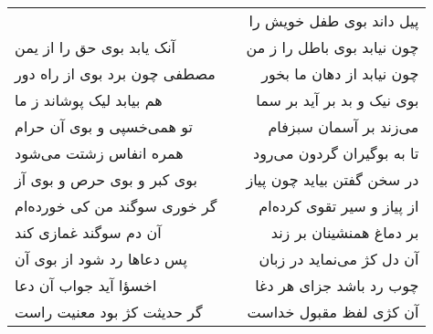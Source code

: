 \begin{center}
\begin{longtable}{l p{0.5cm} r}
&&
پیل داند بوی طفل خویش را
\\
آنک یابد بوی حق را از یمن
&&
چون نیابد بوی باطل را ز من
\\
مصطفی چون برد بوی از راه دور
&&
چون نیابد از دهان ما بخور
\\
هم بیابد لیک پوشاند ز ما
&&
بوی نیک و بد بر آید بر سما
\\
تو همی‌خسپی و بوی آن حرام
&&
می‌زند بر آسمان سبزفام
\\
همره انفاس زشتت می‌شود
&&
تا به بوگیران گردون می‌رود
\\
بوی کبر و بوی حرص و بوی آز
&&
در سخن گفتن بیاید چون پیاز
\\
گر خوری سوگند من کی خورده‌ام
&&
از پیاز و سیر تقوی کرده‌ام
\\
آن دم سوگند غمازی کند
&&
بر دماغ همنشینان بر زند
\\
پس دعاها رد شود از بوی آن
&&
آن دل کژ می‌نماید در زبان
\\
اخسؤا آید جواب آن دعا
&&
چوب رد باشد جزای هر دغا
\\
گر حدیثت کژ بود معنیت راست
&&
آن کژی لفظ مقبول خداست
\\
\end{longtable}
\end{center}
